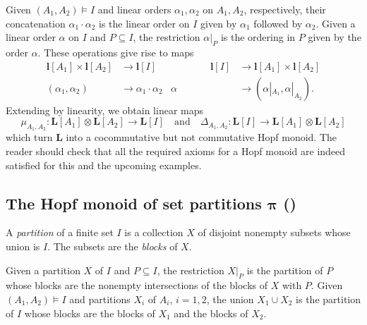 \documentclass[ALCO,ThmDefs,Unicode,epreuves]{cedram}
\newcommand{\rL}{\mathbf{l}}
\newcommand{\bL}{\mathbf{L}}
\newcommand{\bPi}{\bpi}
\newcommand{\bpi}{\boldsymbol \pi}
\newcommand{\qand}{\quad\text{and}\quad}
\begin{document}
Given $(A_1,A_2)\models I$
and linear orders $\alpha_1,\alpha_2$ on $A_1,A_2$, respectively,
their concatenation $\alpha_1\cdot \alpha_2$ 
is the linear order on $I$ given by $\alpha_1$ followed by $\alpha_2$.
Given a linear order $\alpha$ on $I$ and $P\subseteq I$, the restriction 
 $\alpha|_P$ is the ordering in $P$ given by the order $\alpha$.
These operations give rise to maps
\begin{equation}\label{e:L}
\begin{aligned}
\rL[A_1]\times\rL[A_2] & \to \rL[I] &\qquad\qquad \rL[I] & \to \rL[A_1]\times\rL[A_2]\\
(\alpha_1,\alpha_2) & \to \alpha_1\cdot\alpha_2
& \alpha & \to (\alpha |_{A_1},\alpha |_{A_2}).
\end{aligned}
\end{equation}
Extending by linearity, we obtain linear maps
\[
 \mu_{A_1,A_2}:\bL[A_1]\otimes\bL[A_2] \to \bL[I]
 \qand
\Delta_{A_1,A_2}:\bL[I]\to \bL[A_1]\otimes\bL[A_2]
\]
which turn $\bL$ into a cocommutative but not commutative Hopf monoid. The reader should check that all the required axioms for a Hopf monoid are indeed satisfied for this and the upcoming examples.


\subsection{The Hopf monoid of set partitions \texorpdfstring{$\bPi$ (\cite{AM:2010})}{pi ([4])} }\label{ss:partition}

A \emph{partition} of a finite set $I$ is a collection $X$ of disjoint nonempty subsets whose union is $I$. The subsets are the \emph{blocks} of $X$.

Given a partition $X$ of $I$ and $P\subseteq I$, the restriction
$X|_P$ is the partition of $P$ whose blocks are 
the nonempty intersections of the blocks of $X$ with $P$.
Given $(A_1,A_2)\models I$
and partitions $X_i$ of $A_i$, $i=1,2$, 
the union $X_1\cup X_2$ is the partition of $I$ 
whose blocks are the blocks of $X_1$ and the blocks of $X_2$.
\end{document}
